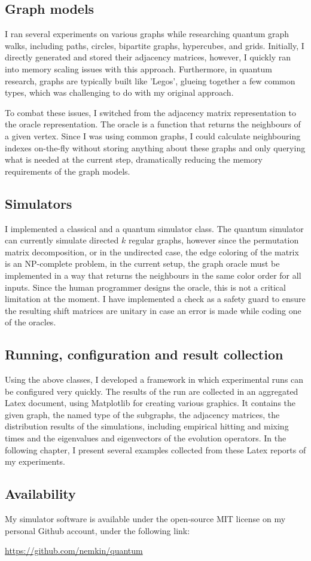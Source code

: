 \subsection{Graph models}

I ran several experiments on various graphs while researching quantum graph walks, including paths, circles, bipartite graphs, hypercubes, and grids. Initially, I directly generated and stored their adjacency matrices, however, I quickly ran into memory scaling issues with this approach. Furthermore, in quantum research, graphs are typically built like 'Legos', glueing together a few common types, which was challenging to do with my original approach.

To combat these issues, I switched from the adjacency matrix representation to the oracle representation. The oracle is a function that returns the neighbours of a given vertex. Since I was using common graphs, I could calculate neighbouring indexes on-the-fly without storing anything about these graphs and only querying what is needed at the current step, dramatically reducing the memory requirements of the graph models.

\subsection{Simulators}

I implemented a classical and a quantum simulator class. The quantum simulator can currently simulate directed $k$ regular graphs, however since the permutation matrix decomposition, or in the undirected case, the edge coloring of the matrix is an NP-complete problem, in the current setup, the graph oracle must be implemented in a way that returns the neighbours in the same color order for all inputs. Since the human programmer designs the oracle, this is not a critical limitation at the moment. I have implemented a check as a safety guard to ensure the resulting shift matrices are unitary in case an error is made while coding one of the oracles.

\subsection{Running, configuration and result collection}

Using the above classes, I developed a framework in which experimental runs can be configured very quickly. The results of the run are collected in an aggregated Latex document, using Matplotlib for creating various graphics. It contains the given graph, the named type of the subgraphs, the adjacency matrices, the distribution results of the simulations, including empirical hitting and mixing times and the eigenvalues and eigenvectors of the evolution operators. In the following chapter, I present several examples collected from these Latex reports of my experiments.

\subsection{Availability}

My simulator software is available under the open-source MIT license on my personal Github account, under the following link:

\url{https://github.com/nemkin/quantum}